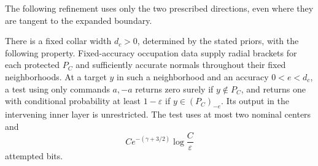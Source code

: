 The following refinement uses only the two prescribed directions, even
where they are tangent to the expanded boundary.
\begin{lemma}
\label{lem:two-field-rare}
There is a fixed collar width $d_c>0$, determined by the stated priors,
with the following property.  Fixed-accuracy occupation data supply
radial brackets for each protected $P_C$ and sufficiently accurate
normals throughout their fixed neighborhoods.  At a target $y$ in such
a neighborhood and an accuracy $0<e<d_c$, a test using only commands
$a,-a$ returns zero surely if $y\notin P_C$, and returns one with
conditional probability at least $1-\varepsilon$ if
$y\in(P_C)_{-e}$.  Its output in the intervening inner layer is
unrestricted.  The test uses at most two nominal centers and
\begin{equation}\label{eq:two-field-rare-cost}
 C e^{-(\gamma+3/2)}\log\frac C\varepsilon
\end{equation}
attempted bits.
\end{lemma}
